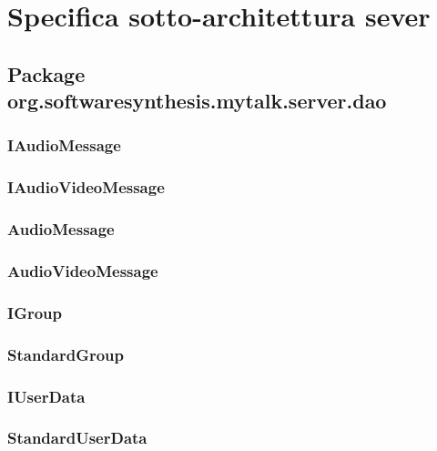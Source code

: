 \clearpage

\section{Specifica sotto-architettura sever}\label{sec:serverarchitecture}

\subsection{Package org.softwaresynthesis.mytalk.server.dao}\label{sec:dao}

\subsubsection{IAudioMessage}\label{sec:iaudiomessage}

\subsubsection{IAudioVideoMessage}\label{sec:iaudiovideomessage}

\subsubsection{AudioMessage}\label{sec:audiomessage}

\subsubsection{AudioVideoMessage}\label{sec:audiovideomessage}

\subsubsection{IGroup}\label{sec:igroup}

\subsubsection{StandardGroup}\label{sec:standardgroup}

\subsubsection{IUserData}\label{sec:iuserdata}

\subsubsection{StandardUserData}\label{sec:standarduserdata}

